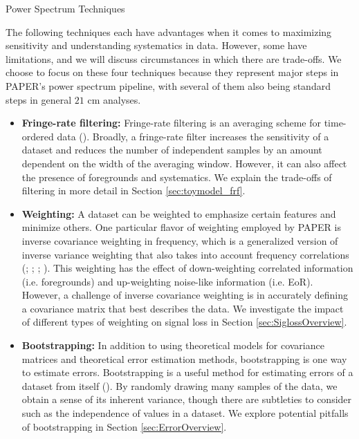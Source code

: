 \documentclass[preprint2,numberedappendix,tighten]{aastex6}  %
\begin{document}
\begin{center}
Power Spectrum Techniques
\end{center}

The following techniques each have advantages when it comes to maximizing sensitivity and understanding systematics in 
data. However, some have limitations, and we will discuss circumstances in which there are trade-offs. We choose to focus on 
these four techniques because they represent major steps in PAPER's power spectrum pipeline, with several of them also 
being standard steps in general $21$ cm analyses.
\begin{itemize}
\item \textbf{Fringe-rate filtering:} Fringe-rate filtering is an averaging scheme for time-ordered data 
(\citealt{parsons_et_al2016}). Broadly, a fringe-rate filter increases the sensitivity of a dataset and reduces the number of 
independent samples by an amount dependent on the width of the averaging window. However, it can also affect the presence 
of foregrounds and systematics. We explain the trade-offs of filtering in more detail in Section \ref{sec:toymodel_frf}.
\item \textbf{Weighting:} A dataset can be weighted to emphasize certain features and minimize others. One particular flavor of 
weighting employed by PAPER is inverse covariance weighting in frequency, which is a generalized version of inverse variance 
weighting that also takes into account frequency correlations (\citealt{liu_tegmark2011}; \citealt{dillon_et_al2013a}; \citealt{liu_et_al2014a}; \citealt{liu_et_al2014b}). This weighting has the effect of down-weighting correlated 
information (i.e. foregrounds) and up-weighting noise-like information (i.e. EoR). However, a challenge of inverse covariance 
weighting is in accurately defining a covariance matrix that best describes the data. We investigate the impact of different types of weighting on signal loss in Section \ref{sec:SiglossOverview}.
\item \textbf{Bootstrapping:} In addition to using theoretical models for covariance matrices and theoretical error estimation 
methods, bootstrapping is one way to estimate errors. Bootstrapping is a useful method for estimating errors of a dataset from 
itself (\citealt{andrae2010}). By randomly drawing many samples of the data, we obtain a sense of its inherent variance, though there are subtleties to 
consider such as the independence of values in a dataset. We explore potential pitfalls of bootstrapping in Section \ref{sec:ErrorOverview}.

\end{itemize}
\end{document}
